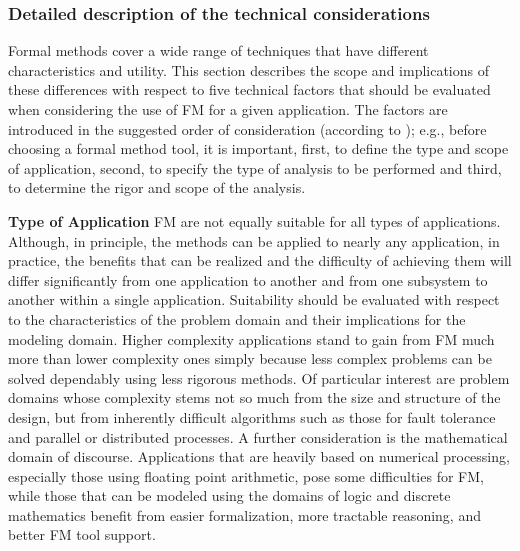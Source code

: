 \documentclass{template/openetcs_report}
\begin{document}
\subsubsection{Detailed description of the technical considerations}
Formal methods cover a wide range of techniques that have different characteristics and utility. This section describes the scope and implications of these differences with respect to five technical factors that should be evaluated when considering the use of FM for a given application. The factors are introduced in the suggested order of consideration (according to \cite{FM-doc}); e.g., before choosing a formal method tool, it is important, first, to define the type and scope of application, second, to specify the type of analysis to be performed and third, to determine the rigor and scope of the analysis.

\textbf{Type of Application}
FM are not equally suitable for all types of applications. Although, in principle, the methods can be applied to nearly any application, in practice, the benefits that can be realized and the difficulty of achieving them will differ significantly from one application to another and from one subsystem to another within a single application. Suitability should be evaluated with respect to the characteristics of the problem domain and their implications for the modeling domain. 
Higher complexity applications stand to gain from FM much more than lower complexity ones simply because less complex problems can be solved dependably using less rigorous methods. Of particular interest are problem domains whose complexity stems not so much from the size and structure of the design, but from inherently difficult algorithms such as those for fault tolerance and parallel or distributed processes. 
A further consideration is the mathematical domain of discourse. Applications that are heavily based on numerical processing, especially those using floating point arithmetic, pose some difficulties for FM, while those that can be modeled using the domains of logic and discrete mathematics benefit from easier formalization, more tractable reasoning, and better FM tool support.
\end{document}
